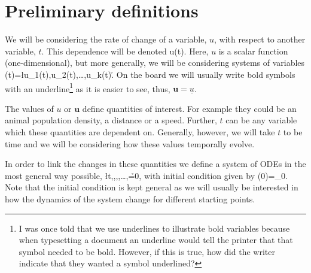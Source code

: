 \section{Preliminary definitions}
We will be considering the rate of change of a variable, $u$, with respect to another variable, $t$. This dependence will be denoted
\bb
u(t).
\ee
Here, $u$ is a scalar function (\ie one-dimensional), but more generally, we will be considering systems of variables
\bb
{}(t)=\l u_1(t),u_2(t),\dots,u_k(t)\r.
\ee
On the board we will usually write bold symbols with an underline\footnote{I was once told that we use underlines to illustrate bold variables because when typesetting a document an underline would tell the printer that that symbol needed to be bold. However, if this is true, how did the writer indicate that they wanted a symbol underlined?} as it is easier to see, thus, $\bm{u}=\underline{u}$.

The values of $u$ or $\bm{u}$ define quantities of interest. For example they could be an animal population density, a distance or a speed. Further, $t$ can be any variable which these quantities are dependent on. Generally, however, we will take $t$ to be time and we will be considering how these values temporally evolve.

In order to link the changes in these quantities we define a system of ODEs in the most general way possible,
\bb
{}\l t,,,,\dots,\r=0,
\ee
with initial condition given by
\bb
{}(0)=_0.
\ee
Note that the initial condition is kept general as we will usually be interested in how the dynamics of the system change for different starting points.

